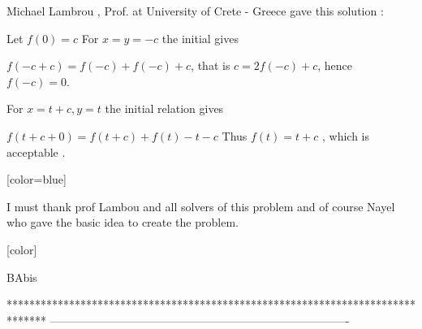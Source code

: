 \begin{solution}
	Michael Lambrou , Prof. at University of Crete - Greece gave this solution :

 Let  $ f(0) = c$ For $ x = y = -c$ the initial gives

                                           $ f(-c + c) = f(-c) + f(-c) + c$, 
that is 
               $ c = 2f(-c) + c$,
 hence $ f(-c) = 0$. 

For  $ x = t + c, y = t$  the initial relation gives 
  
                                              $ f( t + c + 0) = f(t + c) + f(t)-t-c$
Thus $ f(t) = t + c$ , which is acceptable .

 [color=blue]\begin{italicized}I must thank prof Lambou and  all solvers of this problem and of course Nayel who gave the basic idea to create the problem.\end{italicized}[\/color]

 BAbis
\end{solution}
*******************************************************************************
-------------------------------------------------------------------------------


